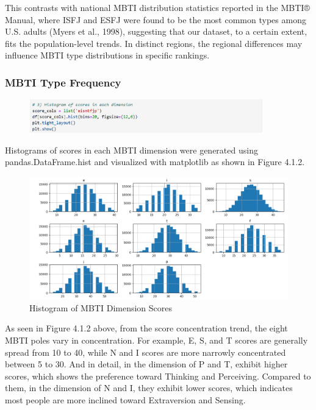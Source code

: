 \documentclass[12pt]{article}
\begin{document}
	This contrasts with national MBTI distribution statistics reported in the MBTI® Manual, where ISFJ and ESFJ were found to be the most common types among U.S. adults (Myers et al., 1998), suggesting that our dataset, to a certain extent, fits the population-level trends. In distinct regions, the regional differences may influence MBTI type distributions in specific rankings.
	
	\subsubsection{MBTI Type Frequency}
		\begin{figure}[H]
		\centering
		\includegraphics[width=0.9\textwidth]{Q1EDA3}
		
	\end{figure}
	
	Histograms of scores in each MBTI dimension were generated using pandas.DataFrame.hist and visualized with matplotlib as shown in Figure 4.1.2.
	\begin{figure}[H]
		\centering
		\includegraphics{Q1EDA4} 
		\caption{Histogram of MBTI Dimension Scores}		
	\end{figure}
	
	As seen in Figure 4.1.2 above, from the score concentration trend, the eight MBTI poles vary in concentration. For example, E, S, and T scores are generally spread from 10 to 40, while N and I scores are more narrowly concentrated between 5 to 30. And in detail, in the dimension of P and T, exhibit higher scores, which shows the preference toward Thinking and Perceiving. Compared to them, in the dimension of N and I, they exhibit lower scores, which indicates most people are more inclined toward Extraversion and Sensing.
	
\end{document}
